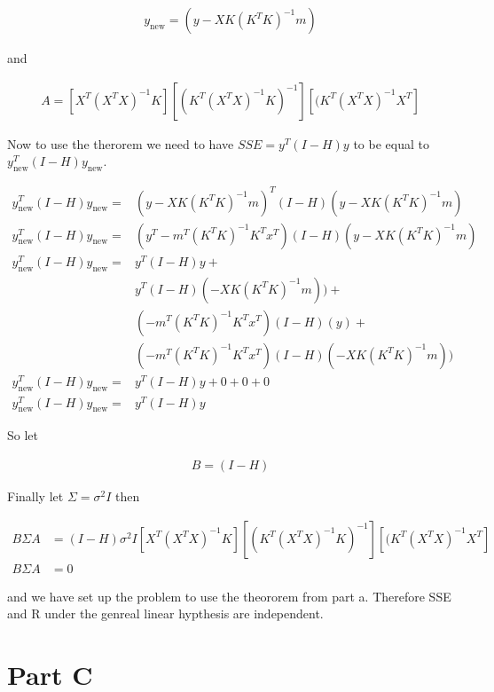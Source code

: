 \documentclass[]{book}
\begin{document}
\begin{align}
  y_{\text{new}} = ( y - X K (K^T K)^{-1} m )
\end{align}

and

\begin{align}
  A = [ X^T (X^T X)^{-1} K ] [ (K^T (X^T X)^{-1} K)^{-1} ] [ (K^T (X^T X)^{-1} X^T]
\end{align}

Now to use the therorem we need to have \(SSE = y^T (I-H) y\) to be equal to \(y_{\text{new}}^T (I-H) y_{\text{new}}\).

\begin{align}
  y_{\text{new}}^T (I-H) y_{\text{new}} =& ( y - X K (K^T K)^{-1} m )^T (I-H) ( y - X K (K^T K)^{-1} m ) \\
  y_{\text{new}}^T (I-H) y_{\text{new}} =& ( y^T - m^T(K^T K)^{-1} K^T x^T ) (I-H) ( y - X K (K^T K)^{-1} m ) \\
  y_{\text{new}}^T (I-H) y_{\text{new}} =& y^T (I-H) y + \\
  & y^T (I-H) (- X K (K^T K)^{-1} m )) + \\
  & (-m^T(K^T K)^{-1} K^T x^T ) (I-H) ( y ) + \\
  & (-m^T(K^T K)^{-1} K^T x^T ) (I-H)(- X K (K^T K)^{-1} m ))\\
  y_{\text{new}}^T (I-H) y_{\text{new}} =& y^T (I-H) y + 0 + 0 + 0\\
   y_{\text{new}}^T (I-H) y_{\text{new}} =& y^T (I-H) y
\end{align}

So let

\begin{align}
  B = (I - H)
\end{align}

Finally let \(\Sigma = \sigma^2 I\) then

\begin{align}
  B \Sigma A &= (I - H) \sigma^2 I [ X^T (X^T X)^{-1} K ] [ (K^T (X^T X)^{-1} K)^{-1} ] [ (K^T (X^T X)^{-1} X^T]\\
  B \Sigma A &= 0
\end{align}

and we have set up the problem to use the theororem from part a. Therefore SSE and R under the genreal linear hypthesis are independent.

\hypertarget{part-c}{%
\section{Part C}\label{part-c}}
\end{document}
